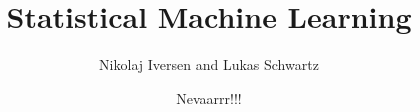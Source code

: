 \documentclass[12pt,a4paper]{article}
\begin{document}
\title{Statistical Machine Learning}
\author{Nikolaj Iversen and Lukas Schwartz}
\date{Nevaarrr!!!}
\maketitle

\newpage

\tableofcontents
\listoffigures
\listoftables

\newpage



\end{document}
